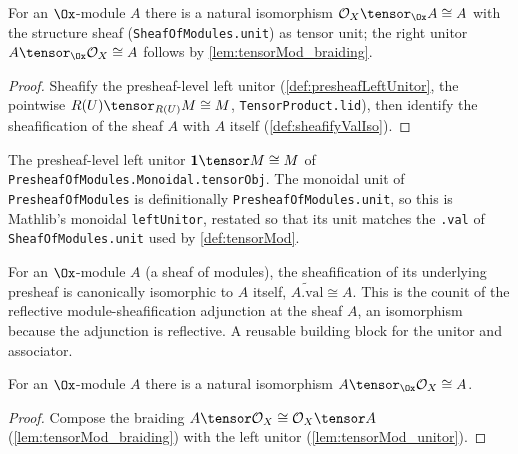 \begin{lemma}
  \label{lem:tensorMod_unitor}
  For an $\Ox$-module $A$ there is a natural isomorphism
  $\mathcal{O}_X \tensor_{\Ox} A \cong A$ with the structure sheaf
  (\texttt{SheafOfModules.unit}) as tensor unit; the right unitor
  $A \tensor_{\Ox} \mathcal{O}_X \cong A$ follows by \cref{lem:tensorMod_braiding}.
  \begin{proof}
    Sheafify the presheaf-level left unitor (\cref{def:presheafLeftUnitor}, the
    pointwise $R(U) \tensor_{R(U)} M \cong M$, \texttt{TensorProduct.lid}), then
    identify the sheafification of the sheaf $A$ with $A$ itself
    (\cref{def:sheafifyValIso}).
  \end{proof}
\end{lemma}

\begin{definition}

  \label{def:presheafLeftUnitor}
  The presheaf-level left unitor
  $\mathbf{1} \tensor M \cong M$ of \texttt{PresheafOfModules.Monoidal.tensorObj}.
  The monoidal unit of \texttt{PresheafOfModules} is definitionally
  \texttt{PresheafOfModules.unit}, so this is Mathlib's monoidal
  \texttt{leftUnitor}, restated so that its unit matches the \texttt{.val} of
  \texttt{SheafOfModules.unit} used by \cref{def:tensorMod}.
\end{definition}

\begin{definition}

  \label{def:sheafifyValIso}
  For an $\Ox$-module $A$ (a sheaf of modules), the sheafification of its underlying
  presheaf is canonically isomorphic to $A$ itself, $\widetilde{A.\mathrm{val}}
  \cong A$. This is the counit of the reflective module-sheafification adjunction at
  the sheaf $A$, an isomorphism because the adjunction is reflective. A reusable
  building block for the unitor and associator.
\end{definition}

\begin{lemma}

  \label{lem:tensorMod_rightUnitor}
  For an $\Ox$-module $A$ there is a natural isomorphism
  $A \tensor_{\Ox} \mathcal{O}_X \cong A$.
  \begin{proof}
    Compose the braiding $A \tensor \mathcal{O}_X \cong \mathcal{O}_X \tensor A$
    (\cref{lem:tensorMod_braiding}) with the left unitor (\cref{lem:tensorMod_unitor}).
  \end{proof}
\end{lemma}

